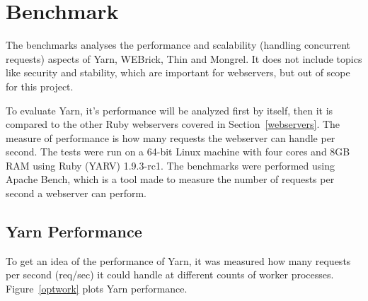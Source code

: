 \section{Benchmark}
\label{eval}
The benchmarks analyses the performance and scalability (handling
concurrent requests) aspects of Yarn, WEBrick, Thin and Mongrel. It does not
include topics like security and stability, which are important for
webservers, but out of scope for this project.

To evaluate Yarn, it's performance will be analyzed first by itself, then it
is compared to the other Ruby webservers covered in Section~\ref{webservers}.
The measure of performance is how many requests the webserver can handle per
second. The tests were run on a 64-bit Linux machine with four cores and 8GB
RAM using Ruby (YARV) 1.9.3-rc1. The benchmarks were performed using Apache
Bench, which is a tool made to measure the number of requests per second a
webserver can perform.

\subsection{Yarn Performance}
To get an idea of the performance of Yarn, it was measured how many requests
per second (req/sec) it could handle at different counts of worker processes.
Figure~\ref{optwork} plots Yarn performance.

